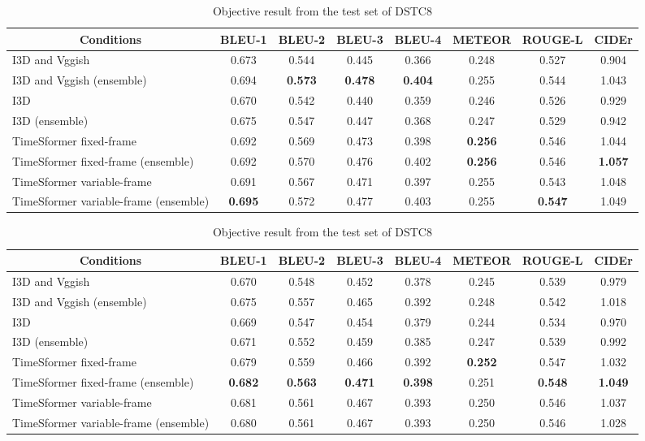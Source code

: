 \documentclass[letterpaper]{article} %
\begin{document}
\begin{table}[t]
  \centering
  \small
  \caption{Objective result from the test set of DSTC7}
  \label{tab:dstc7_result}
  \begin{tabular}{l|ccccccc}\hline
    \multicolumn{1}{c|}{Conditions} & BLEU-1 & BLEU-2 & BLEU-3 & BLEU-4 & METEOR & ROUGE-L & CIDEr \\ \hline
    I3D and Vggish \cite{Li2021bridging} & 0.673 & 0.544 & 0.445 & 0.366 & 0.248 & 0.527 & 0.904 \\
    I3D and Vggish (ensemble) & 0.694 & \textbf{0.573} & \textbf{0.478} & \textbf{0.404} & 0.255 & 0.544 & 1.043 \\
    I3D & 0.670 & 0.542 & 0.440 & 0.359 & 0.246 & 0.526 & 0.929 \\
    I3D (ensemble) & 0.675 & 0.547 & 0.447 & 0.368 & 0.247 & 0.529 & 0.942 \\
    TimeSformer fixed-frame & 0.692 & 0.569 & 0.473 & 0.398 & \textbf{0.256} & 0.546 & 1.044 \\
    TimeSformer fixed-frame (ensemble) & 0.692 & 0.570 & 0.476 & 0.402 & \textbf{0.256} & 0.546 & \textbf{1.057} \\
    TimeSformer variable-frame & 0.691 & 0.567 & 0.471 & 0.397 & 0.255 & 0.543 & 1.048 \\
    TimeSformer variable-frame (ensemble) & \textbf{0.695} & 0.572 & 0.477 & 0.403 & 0.255 & \textbf{0.547} & 1.049 \\ \hline
  \end{tabular}
  
  \centering
  \small
  \caption{Objective result from the test set of DSTC8}
  \label{tab:dstc8_result}
  \begin{tabular}{l|ccccccc}\hline
    \multicolumn{1}{c|}{Conditions} & BLEU-1 & BLEU-2 & BLEU-3 & BLEU-4 & METEOR & ROUGE-L & CIDEr \\ \hline
    I3D and Vggish \cite{Li2021bridging} & 0.670 & 0.548 & 0.452 & 0.378 & 0.245 & 0.539 & 0.979 \\
    I3D and Vggish (ensemble) & 0.675 & 0.557 & 0.465 & 0.392 & 0.248 & 0.542 & 1.018 \\
    I3D & 0.669 & 0.547 & 0.454 & 0.379 & 0.244 & 0.534 & 0.970 \\
    I3D (ensemble) & 0.671 & 0.552 & 0.459 & 0.385 & 0.247 & 0.539 & 0.992 \\
    TimeSformer fixed-frame & 0.679 & 0.559 & 0.466 & 0.392 & \textbf{0.252} & 0.547 & 1.032 \\
    TimeSformer fixed-frame (ensemble) & \textbf{0.682} & \textbf{0.563} & \textbf{0.471} & \textbf{0.398} & 0.251 & \textbf{0.548} & \textbf{1.049} \\
    TimeSformer variable-frame & 0.681 & 0.561 & 0.467 & 0.393 & 0.250 & 0.546 & 1.037 \\
    TimeSformer variable-frame (ensemble) & 0.680 & 0.561 & 0.467 & 0.393 & 0.250 & 0.546 & 1.028 \\ \hline
  \end{tabular}


\end{table}
\end{document}
